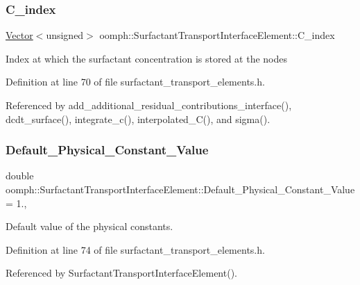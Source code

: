 \subsubsection{\texorpdfstring{C\+\_\+index}{C\_index}}
{\footnotesize\ttfamily \hyperlink{classoomph_1_1Vector}{Vector}$<$unsigned$>$ oomph\+::\+Surfactant\+Transport\+Interface\+Element\+::\+C\+\_\+index\hspace{0.3cm}{\ttfamily [protected]}}

Index at which the surfactant concentration is stored at the nodes 

Definition at line 70 of file surfactant\+\_\+transport\+\_\+elements.\+h.



Referenced by add\+\_\+additional\+\_\+residual\+\_\+contributions\+\_\+interface(), dcdt\+\_\+surface(), integrate\+\_\+c(), interpolated\+\_\+\+C(), and sigma().

\mbox{\label{classoomph_1_1SurfactantTransportInterfaceElement_ae2c6f40fd7bc427636ac25c23d816e74}} 
\subsubsection{\texorpdfstring{Default\+\_\+\+Physical\+\_\+\+Constant\+\_\+\+Value}{Default\_Physical\_Constant\_Value}}
{\footnotesize\ttfamily double oomph\+::\+Surfactant\+Transport\+Interface\+Element\+::\+Default\+\_\+\+Physical\+\_\+\+Constant\+\_\+\+Value = 1.\hspace{0.3cm}{\ttfamily [static]}, {\ttfamily [protected]}}



Default value of the physical constants. 



Definition at line 74 of file surfactant\+\_\+transport\+\_\+elements.\+h.



Referenced by Surfactant\+Transport\+Interface\+Element().

